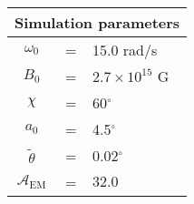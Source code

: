 \begin{tabular}{ccl}
\multicolumn{3}{c}{Simulation parameters} \\
\hline
$\omega_0$  &=& 15.0 rad/s\\
$B_0$  &=& ${2.7}\times 10^{15}$ G \\
$\chi$  &=& 60$^{\circ}$ \\
$a_0$ &=& 4.5$^{\circ}$ \\
$\tilde{\theta}$ &= & 0.02$^{\circ}$ \\
$\mathcal{A}_{\mathrm{EM}}$ &= & $32.0$
\end{tabular}
